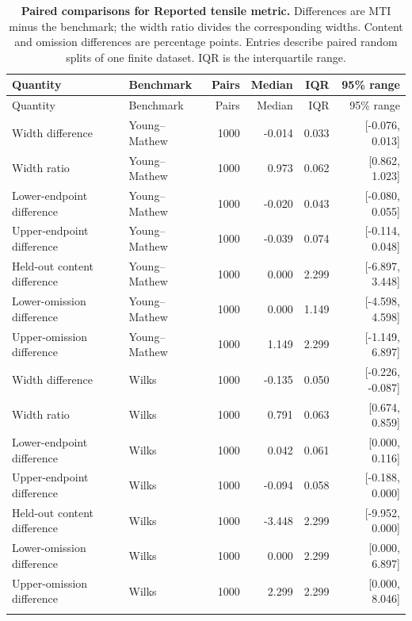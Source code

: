 \begingroup
\footnotesize
\setlength{\tabcolsep}{3pt}
\begin{longtable}{@{}llrrrr@{}}
\caption{\textbf{Paired comparisons for Reported tensile metric.} Differences are MTI minus the benchmark; the width ratio divides the corresponding widths. Content and omission differences are percentage points. Entries describe paired random splits of one finite dataset. IQR is the interquartile range.}\label{rqr2026:tab:supp-pharma-primary-paired}\\
\toprule
Quantity & Benchmark & Pairs & Median & IQR & 95\% range\\
\midrule
\endfirsthead
\toprule
Quantity & Benchmark & Pairs & Median & IQR & 95\% range\\
\midrule
\endhead
Width difference & Young--Mathew & 1000 & -0.014 & 0.033 & [-0.076, 0.013] \\
Width ratio & Young--Mathew & 1000 & 0.973 & 0.062 & [0.862, 1.023] \\
Lower-endpoint difference & Young--Mathew & 1000 & -0.020 & 0.043 & [-0.080, 0.055] \\
Upper-endpoint difference & Young--Mathew & 1000 & -0.039 & 0.074 & [-0.114, 0.048] \\
Held-out content difference & Young--Mathew & 1000 & 0.000 & 2.299 & [-6.897, 3.448] \\
Lower-omission difference & Young--Mathew & 1000 & 0.000 & 1.149 & [-4.598, 4.598] \\
Upper-omission difference & Young--Mathew & 1000 & 1.149 & 2.299 & [-1.149, 6.897] \\
\addlinespace
Width difference & Wilks & 1000 & -0.135 & 0.050 & [-0.226, -0.087] \\
Width ratio & Wilks & 1000 & 0.791 & 0.063 & [0.674, 0.859] \\
Lower-endpoint difference & Wilks & 1000 & 0.042 & 0.061 & [0.000, 0.116] \\
Upper-endpoint difference & Wilks & 1000 & -0.094 & 0.058 & [-0.188, 0.000] \\
Held-out content difference & Wilks & 1000 & -3.448 & 2.299 & [-9.952, 0.000] \\
Lower-omission difference & Wilks & 1000 & 0.000 & 2.299 & [0.000, 6.897] \\
Upper-omission difference & Wilks & 1000 & 2.299 & 2.299 & [0.000, 8.046] \\
\addlinespace
\bottomrule
\end{longtable}
\endgroup
